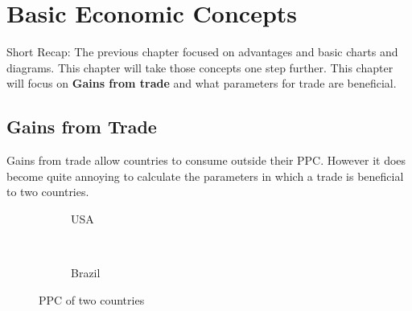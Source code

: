 \chapter{\normalfont Basic Economic Concepts}
Short Recap: The previous chapter focused on advantages and basic charts and diagrams. This chapter will take those concepts one step further. This chapter will focus on \textbf{Gains from trade} and what parameters for trade are beneficial.
\section{Gains from Trade}
Gains from trade allow countries to consume outside their PPC. However it does become quite annoying to calculate the parameters in which a trade is beneficial to two countries. 
\begin{figure}[h!]
    \begin{center}
        \begin{subfigure}[b]{0.45\textwidth}
        \begin{center}
        \caption{USA}
        \label{fig:usa}
    \end{center}
    \end{subfigure}
    ~
    \begin{subfigure}[b]{0.45\textwidth}
        \begin{center}
        \caption{Brazil}
        \label{fig:brazil}
    \end{center}
    \end{subfigure}
    \caption{PPC of two countries}
    \label{fig:usa and brazil}
\end{center}
\end{figure}
